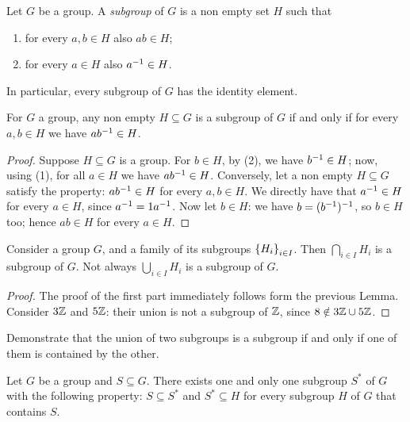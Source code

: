 \begin{definition}
Let \(G\) be a group. A {\em subgroup} of \(G\) is a non empty set \(H\) such that
\begin{enumerate}
\item for every \(a, b \in H\) also \(a b \in H\);
\item for every \(a \in H\) also \(a^{-1} \in H\).
\end{enumerate}
\end{definition}

In particular, every subgroup of \(G\) has the identity element. 

\begin{lemma}\label{lem:SubgroupsCond}
For \(G\) a group, any non empty \(H \subseteq G\) is a subgroup of \(G\) if and only if for every \(a, b \in H\) we have \(a b^{-1} \in H\).
\end{lemma}

\begin{proof}
Suppose \(H \subseteq G\) is a group. For \(b \in H\), by (2), we have \(b^{-1} \in H\); now, using (1), for all \(a \in H\) we have \(ab^{-1} \in H\). Conversely, let a non empty \(H \subseteq G\) satisfy the property: \(a b^{-1} \in H\) for every \(a, b \in H\). We directly have that \(a^{-1} \in H\) for every \(a \in H\), since \(a^{-1} = 1 a^{-1}\). Now let \(b \in H\): we have \(b = (b^{-1})^{-1}\), so \(b \in H\) too; hence \(a b \in H\) for every \(a \in H\).
\end{proof}

\begin{proposition}
Consider a group \(G\), and a family of its subgroups \(\left\{H_i\right\}_{i \in I}\). Then \(\bigcap_{i \in I} H_i\) is a subgroup of \(G\). Not always \(\bigcup_{i \in I} H_i\) is a subgroup of \(G\).
\end{proposition}

\begin{proof}
The proof of the first part immediately follows form the previous Lemma. Consider \(3 \mathbb Z\) and \(5\mathbb Z\): their union is not a subgroup of \(\mathbb Z\), since \(8 \notin 3\mathbb Z \cup 5\mathbb Z\).
\end{proof}

\begin{exercise}
Demonstrate that the union of two subgroups is a subgroup if and only if one of them is contained by the other.
\end{exercise}

\begin{proposition}
Let \(G\) be a group and \(S \subseteq G\). There exists one and only one subgroup \(S^\ast\) of \(G\) with the following property: \(S \subseteq S^\ast\) and \(S^\ast \subseteq H\) for every subgroup \(H\) of \(G\) that contains \(S\).
\end{proposition}

